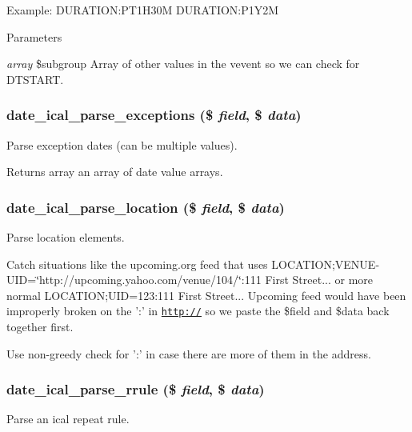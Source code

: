 Example: DURATION:PT1H30M DURATION:P1Y2M


\begin{DoxyParams}{Parameters}
\item[{\em array}]\$subgroup Array of other values in the vevent so we can check for DTSTART. \end{DoxyParams}
\hypertarget{date__api__ical_8inc_a6f1c803e50f78faab69c8348c1dd8c1f}{
\subsubsection[{date\_\-ical\_\-parse\_\-exceptions}]{\setlength{\rightskip}{0pt plus 5cm}date\_\-ical\_\-parse\_\-exceptions (\$ {\em field}, \/  \$ {\em data})}}
\label{date__api__ical_8inc_a6f1c803e50f78faab69c8348c1dd8c1f}
Parse exception dates (can be multiple values).

\begin{DoxyReturn}{Returns}
array an array of date value arrays. 
\end{DoxyReturn}
\hypertarget{date__api__ical_8inc_a28db1e5fc29fc45ff15e1bdab89235d5}{
\subsubsection[{date\_\-ical\_\-parse\_\-location}]{\setlength{\rightskip}{0pt plus 5cm}date\_\-ical\_\-parse\_\-location (\$ {\em field}, \/  \$ {\em data})}}
\label{date__api__ical_8inc_a28db1e5fc29fc45ff15e1bdab89235d5}
Parse location elements.

Catch situations like the upcoming.org feed that uses LOCATION;VENUE-\/UID=\char`\"{}http://upcoming.yahoo.com/venue/104/\char`\"{}:111 First Street... or more normal LOCATION;UID=123:111 First Street... Upcoming feed would have been improperly broken on the ':' in \href{http://}{\tt http://} so we paste the \$field and \$data back together first.

Use non-\/greedy check for ':' in case there are more of them in the address. \hypertarget{date__api__ical_8inc_adaf397fd219714e7a7fd430e179ee592}{
\subsubsection[{date\_\-ical\_\-parse\_\-rrule}]{\setlength{\rightskip}{0pt plus 5cm}date\_\-ical\_\-parse\_\-rrule (\$ {\em field}, \/  \$ {\em data})}}
\label{date__api__ical_8inc_adaf397fd219714e7a7fd430e179ee592}
Parse an ical repeat rule.

